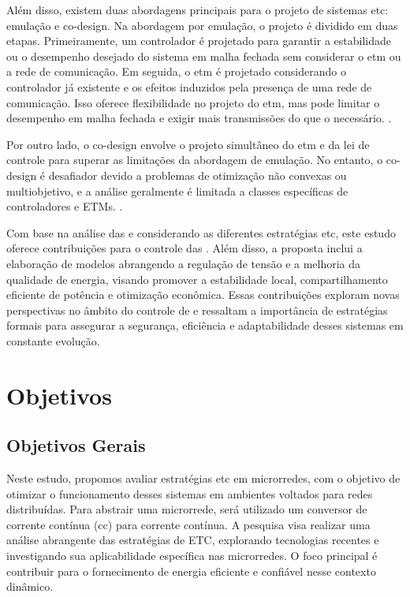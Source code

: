 Além disso, existem duas abordagens principais para o projeto de sistemas \acrshort{etc}: emulação e co-design. Na abordagem por emulação, o projeto é dividido em duas etapas. Primeiramente, um controlador é projetado para garantir a estabilidade ou o desempenho desejado do sistema em malha fechada sem considerar o \acrshort{etm} ou a rede de comunicação. Em seguida, o \acrshort{etm} é projetado considerando o controlador já existente e os efeitos induzidos pela presença de uma rede de comunicação. Isso oferece flexibilidade no projeto do \acrshort{etm}, mas pode limitar o desempenho em malha fechada e exigir mais transmissões do que o necessário. \cite{coutinho2021}.

Por outro lado, o co-design envolve o projeto simultâneo do \acrshort{etm} e da lei de controle para superar as limitações da abordagem de emulação. No entanto, o co-design é desafiador devido a problemas de otimização não convexas ou multiobjetivo, e a análise geralmente é limitada a classes específicas de controladores e ETMs. \cite{coutinho2021}.

Com base na análise das  e considerando as diferentes estratégias \acrshort{etc}, este estudo oferece contribuições para o controle das . Além disso, a proposta inclui a elaboração de modelos abrangendo a regulação de tensão e a melhoria da qualidade de energia, visando promover a estabilidade local, compartilhamento eficiente de potência e otimização econômica. Essas contribuições exploram novas perspectivas no âmbito do controle de  e ressaltam a importância de estratégias formais para assegurar a segurança, eficiência e adaptabilidade desses sistemas em constante evolução.


\section{Objetivos}

\subsection{Objetivos Gerais}

Neste estudo, propomos avaliar estratégias \acrshort{etc} em microrredes, com o objetivo de otimizar o funcionamento desses sistemas em ambientes voltados para redes distribuídas. Para abstrair uma microrrede, será utilizado um conversor de corrente contínua (\acrshort{cc}) para corrente contínua. A pesquisa visa realizar uma análise abrangente das estratégias de ETC, explorando tecnologias recentes e investigando sua aplicabilidade específica nas microrredes. O foco principal é contribuir para o fornecimento de energia eficiente e confiável nesse contexto dinâmico.

